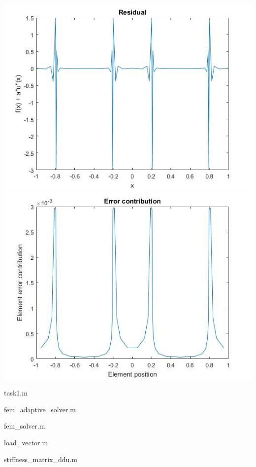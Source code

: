 \documentclass[12pt]{article}
\begin{document}
	\includegraphics[width=\textwidth]{p1_resid}
	\includegraphics[width=\textwidth]{p1_errind}
	
	
	\newpage
	\large{task1.m}
 	\normalsize
	
	
	
	\newpage
	\large{fem\_adaptive\_solver.m}
	\normalsize
	
	
	
	\newpage
	\large{fem\_solver.m}
	\normalsize	
	
	
	
	\newpage
	\large{load\_vector.m}
	\normalsize	
	
	
	
	\newpage
	\large{stiffness\_matrix\_ddu.m}
	\normalsize	
	
	
\end{document}
